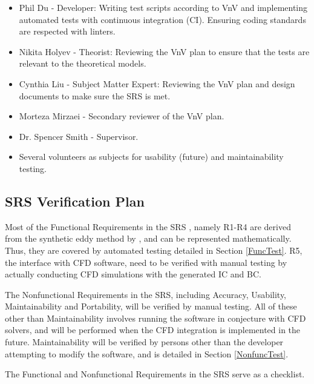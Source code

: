 \documentclass[12pt, titlepage]{article}
\begin{document}
\begin{itemize}
  \item Phil Du - Developer: Writing test scripts according to VnV and implementing automated tests with continuous integration (CI). Ensuring coding standards are respected with linters.
  \item Nikita Holyev - Theorist: Reviewing the VnV plan to ensure that the tests are relevant to the theoretical models.
  \item Cynthia Liu - Subject Matter Expert: Reviewing the VnV plan and design documents to make sure the SRS is met.
  \item Morteza Mirzaei - Secondary reviewer of the VnV plan.
  \item Dr. Spencer Smith - Supervisor.
  \item Several volunteers as subjects for usability (future) and maintainability testing.
\end{itemize}


\subsection{SRS Verification Plan}

Most of the Functional Requirements in the SRS \citet{SRS}, namely R1-R4 are derived from the synthetic eddy method by \citet{PolettoEtAl2013}, and can be represented mathematically. Thus, they are covered by automated testing detailed in Section \ref{FuncTest}. R5, the interface with CFD software, need to be verified with manual testing by actually conducting CFD simulations with the generated IC and BC.

The Nonfunctional Requirements in the SRS, including Accuracy, Usability, Maintainability and Portability, will be verified by manual testing. All of these other than Maintainability involves running the software in conjecture with CFD solvers, and will be performed when the CFD integration is implemented in the future. Maintainability will be verified by persons other than the developer attempting to modify the software, and is detailed in Section \ref{NonfuncTest}.

The Functional and Nonfunctional Requirements in the SRS serve as a checklist.

\end{document}
